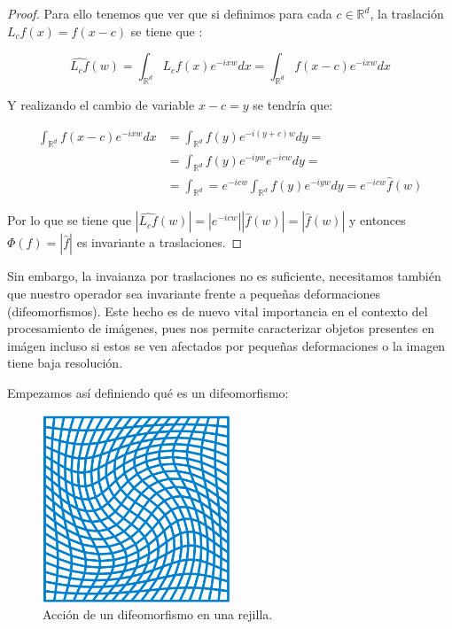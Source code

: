 \begin{proof}
    \noindent Para ello tenemos que ver que si definimos para cada $c \in \mathbb{R}^d$, la traslación $L_cf(x)=f(x-c)$ se tiene que :  
    
    $$\widehat{L_cf}(w)=\int_{\mathbb{R}^d}{L_cf(x) e^{-ixw} dx}=\int_{\mathbb{R}^d}{f(x-c)e^{-ixw}dx}$$
    
    \noindent Y realizando el cambio de variable $x-c=y$ se tendría que: 
    
    \begin{align*}
        \int_{\mathbb{R}^d}{f(x-c)e^{-ixw}dx} &= \int_{\mathbb{R}^d}{f(y)e^{-i(y+c)w}dy}= \\      &=\int_{\mathbb{R}^d}{f(y)e^{-iyw}e^{-icw}dy}= \\ &=\int_{\mathbb{R}^d}=e^{-icw}\int_{\mathbb{R}^d}{f(y)e^{-iyw}dy}=e^{-icw}\widehat{f}(w)
    \end{align*}
    
    \noindent Por lo que se tiene que $|\widehat{L_cf}(w)|=|e^{-icw}| |\widehat{f}(w)|=|\widehat{f}(w)|$ y entonces $\Phi(f)=|\widehat{f}|$ es invariante a traslaciones. \qedhere
\end{proof}

\medskip
    
\noindent Sin embargo, la invaianza por traslaciones no es suficiente, necesitamos también que nuestro operador sea invariante frente a pequeñas deformaciones (difeomorfismos). Este hecho es de nuevo vital importancia en el contexto del procesamiento de imágenes, pues nos permite caracterizar objetos presentes en imágen incluso si estos se ven afectados por pequeñas deformaciones o la imagen tiene baja resolución.

Empezamos así definiendo qué es un difeomorfismo: 

\begin{figure}[!h]
    \centering
    \includegraphics[width=0.5\textwidth]{img/Diffeomorphism.png}
    \caption{Acción de un difeomorfismo en una rejilla.}
    \label{fig:difeomorfismo}
\end{figure}

